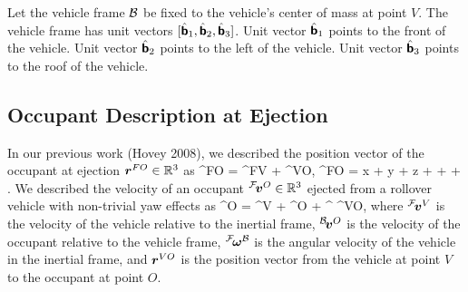 \documentclass[10pt,legalpaper,twocolumn,reqno]{amsart}
\begin{document}
Let the vehicle frame $\mathcal{B}$ be fixed to the vehicle's center of mass at point $V$.
The vehicle frame has unit vectors $[\hat{\mbox{\boldmath $\sf{b}$}}_1, \hat{\mbox{\boldmath $\sf{b}$}}_2, \hat{\mbox{\boldmath $\sf{b}$}}_3]$.
Unit vector $\hat{\mbox{\boldmath $\sf{b}$}}_1$ points to the front of the vehicle.
Unit vector $\hat{\mbox{\boldmath $\sf{b}$}}_2$ points to the left of the vehicle.
Unit vector $\hat{\mbox{\boldmath $\sf{b}$}}_3$ points to the roof of the vehicle.

\subsection{Occupant Description at Ejection}
In our previous work (Hovey 2008), we described the position vector of the 
occupant at ejection $\mbox{\boldmath $r$}^{FO} \in \mathbb{R}^3$ as
\be
 \vr^{FO} = \vr^{FV} + \vr^{VO}, 
\ee
\be
 \vr^{FO} = x \; \vefa + y \; \vefb + z \; \vefc + \chi \; \veba + \rho \cos \phi 
 \; \vebb + \rho \sin \phi \; \vebc.
\ee
We described the velocity of an occupant 
${}^{\mathcal{F}}\!\mbox{\boldmath $v$}^{O} \in \mathbb{R}^3$
ejected from a rollover vehicle with non-trivial yaw effects as
\be
{}\vv^{O} =  \vv^{V} +  \vv^{O} +  \vomega^{\cB} \times \vr^{VO},
 \label{eq:velocity}
\ee
where ${}^{\mathcal{F}}\!\mbox{\boldmath $v$}^{V}$ is the velocity of the vehicle relative to the inertial frame, 
${}^{\mathcal{B}}\!\mbox{\boldmath $v$}^{O}$ is the velocity of the occupant relative to the vehicle frame,
${}^{\mathcal{F}}\!\mbox{\boldmath $\omega$}^{\mathcal{B}}$ is the angular velocity of the vehicle in the inertial frame,
and
$\mbox{\boldmath $r$}^{VO}$ is the position vector from the vehicle at point $V$ to the occupant at point $O$.
\end{document}
